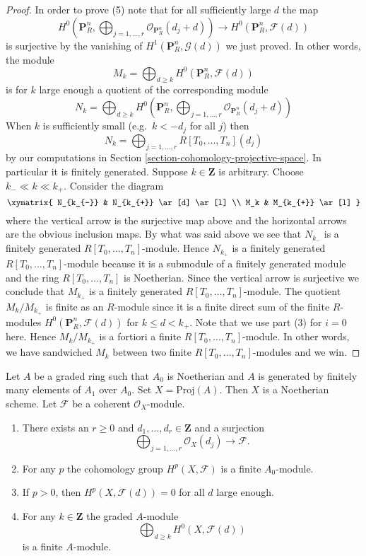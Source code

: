 \begin{proof}
\medskip\noindent
In order to prove (5) note that for all sufficiently large $d$
the map
$$
H^0(\mathbf{P}^n_R, \bigoplus\nolimits_{j = 1, \ldots, r}
\mathcal{O}_{\mathbf{P}^n_R}(d_j + d))
\to
H^0(\mathbf{P}^n_R, \mathcal{F}(d))
$$
is surjective by the vanishing of $H^1(\mathbf{P}^n_R, \mathcal{G}(d))$
we just proved. In other words, the module
$$
M_k
=
\bigoplus\nolimits_{d \geq k} H^0(\mathbf{P}^n_R, \mathcal{F}(d))
$$
is for $k$ large enough a quotient of the corresponding module
$$
N_k
=
\bigoplus\nolimits_{d \geq k} H^0(\mathbf{P}^n_R,
\bigoplus\nolimits_{j = 1, \ldots, r}
\mathcal{O}_{\mathbf{P}^n_R}(d_j + d)
)
$$
When $k$ is sufficiently small (e.g.\ $k < -d_j$ for all $j$) then
$$
N_k = \bigoplus\nolimits_{j = 1, \ldots, r}
R[T_0, \ldots, T_n](d_j)
$$
by our computations in Section \ref{section-cohomology-projective-space}.
In particular it is finitely generated.
Suppose $k \in \mathbf{Z}$ is arbitrary.
Choose $k_{-} \ll k \ll k_{+}$.
Consider the diagram
$$
\xymatrix{
N_{k_{-}} & N_{k_{+}} \ar[d] \ar[l] \\
M_k & M_{k_{+}} \ar[l]
}
$$
where the vertical arrow is the surjective map above and
the horizontal arrows are the obvious inclusion maps.
By what was said above we see that $N_{k_{-}}$ is a finitely
generated $R[T_0, \ldots, T_n]$-module. Hence $N_{k_{+}}$ is
a finitely generated $R[T_0, \ldots, T_n]$-module because it
is a submodule of a finitely generated module and the ring
$R[T_0, \ldots, T_n]$ is Noetherian. Since the vertical arrow
is surjective we conclude that $M_{k_{+}}$ is a finitely
generated $R[T_0, \ldots, T_n]$-module. The quotient
$M_k/M_{k_{+}}$ is finite as an $R$-module since it is a
finite direct sum of the finite $R$-modules
$H^0(\mathbf{P}^n_R, \mathcal{F}(d))$ for $k \leq d < k_{+}$.
Note that we use part (3) for $i = 0$ here. Hence
$M_k/M_{k_{+}}$ is a fortiori a finite $R[T_0, \ldots, T_n]$-module.
In other words, we have sandwiched $M_k$ between two finite
$R[T_0, \ldots, T_n]$-modules and we win.
\end{proof}

\begin{lemma}
\label{lemma-coherent-on-proj}
Let $A$ be a graded ring such that $A_0$ is Noetherian and
$A$ is generated by finitely many elements of $A_1$ over $A_0$.
Set $X = \text{Proj}(A)$. Then $X$ is a Noetherian scheme.
Let $\mathcal{F}$ be a coherent $\mathcal{O}_X$-module.
\begin{enumerate}
\item There exists an $r \geq 0$ and
$d_1, \ldots, d_r \in \mathbf{Z}$ and a surjection
$$
\bigoplus\nolimits_{j = 1, \ldots, r} \mathcal{O}_X(d_j)
\longrightarrow \mathcal{F}.
$$
\item For any $p$ the cohomology group $H^p(X, \mathcal{F})$ is a finite
$A_0$-module.
\item If $p > 0$, then $H^p(X, \mathcal{F}(d)) = 0$ for all $d$ large enough.
\item For any $k \in \mathbf{Z}$ the graded $A$-module
$$
\bigoplus\nolimits_{d \geq k} H^0(X, \mathcal{F}(d))
$$
is a finite $A$-module.
\end{enumerate}
\end{lemma}

